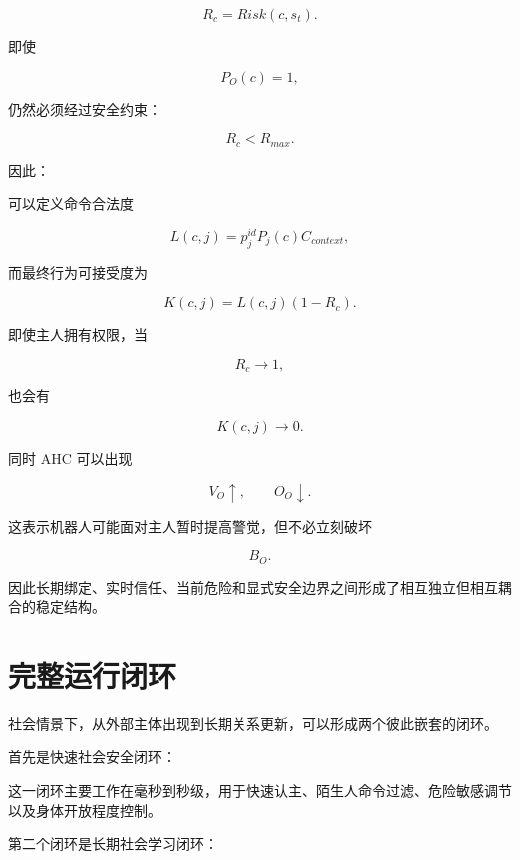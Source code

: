 \[
R_c
=
Risk(c,s_t).
\]

即使

\[
P_O(c)=1,
\]

仍然必须经过安全约束：

\[
R_c<R_{max}.
\]

因此：

\begin{statementbox}
\centering
{}
\end{statementbox}

可以定义命令合法度

\[
L(c,j)
=
p_j^{id}
P_j(c)
C_{context},
\]

而最终行为可接受度为

\[
K(c,j)
=
L(c,j)
(1-R_c).
\]

即使主人拥有权限，当

\[
R_c\rightarrow1,
\]

也会有

\[
K(c,j)\rightarrow0.
\]

同时 AHC 可以出现

\[
V_O\uparrow,
\qquad
O_O\downarrow.
\]

这表示机器人可能面对主人暂时提高警觉，但不必立刻破坏

\[
B_O.
\]

因此长期绑定、实时信任、当前危险和显式安全边界之间形成了相互独立但相互耦合的稳定结构。


\section{完整运行闭环}

社会情景下，从外部主体出现到长期关系更新，可以形成两个彼此嵌套的闭环。

首先是快速社会安全闭环：

\begin{statementbox}
\centering
{}
\end{statementbox}

这一闭环主要工作在毫秒到秒级，用于快速认主、陌生人命令过滤、危险敏感调节以及身体开放程度控制。

第二个闭环是长期社会学习闭环：

\begin{statementbox}
\centering
{}
\end{statementbox}

